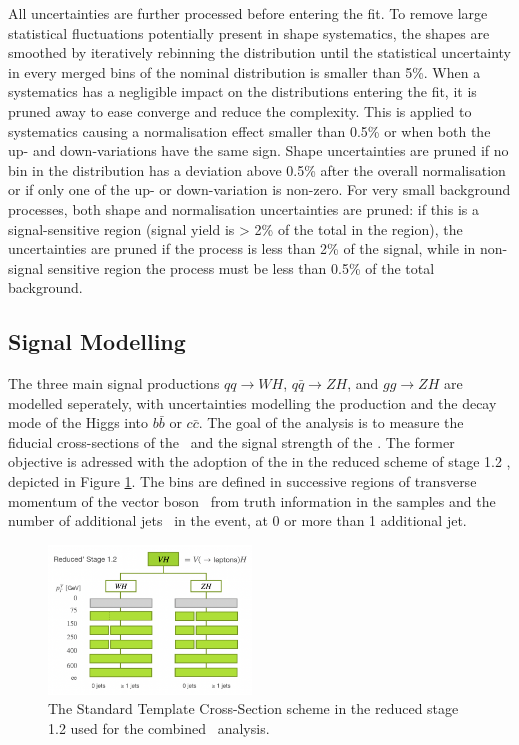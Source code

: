 All uncertainties are further processed before entering the fit. To remove large statistical fluctuations potentially present in shape systematics, the shapes are smoothed by iteratively rebinning the distribution until the statistical uncertainty in every merged bins of the nominal distribution is smaller than 5\%. When a systematics has a negligible impact on the distributions entering the fit, it is pruned away to ease converge and reduce the complexity. This is applied to systematics causing a normalisation effect smaller than 0.5\% or when both the up- and down-variations have the same sign. Shape uncertainties are pruned if no bin in the distribution has a deviation above 0.5\% after the overall normalisation or if only one of the up- or down-variation is non-zero. For very small background processes, both shape and normalisation uncertainties are pruned: if this is a signal-sensitive region (signal yield is > 2\% of the total in the region), the uncertainties are pruned if the process is less than 2\% of the signal, while in non-signal sensitive region the process must be less than 0.5\% of the total background.  

\subsection{Signal Modelling}\label{sec-modSignal}
The three main signal productions $qq \rightarrow WH$, $q\bar{q} \rightarrow ZH$, and $gg \rightarrow ZH$ are modelled seperately, with uncertainties modelling the production and the decay mode of the Higgs into $b\bar{b}$ or $c\bar{c}$. The goal of the analysis is to measure the fiducial cross-sections of the \vhb\ and the signal strength of the \vhc. The former objective is adressed with the adoption of the  in the reduced scheme of stage 1.2 \cite{badger2016les, berger2019simplified}, depicted in Figure \ref{fig:model-stxsscheme}. The bins are defined in successive regions of transverse momentum of the vector boson \ptv\ from truth information in the samples and the number of additional jets \nj\ in the event, at 0 or more than 1 additional jet.
  
  \begin{figure}[!htbp]
    \centering
    \includegraphics[width=0.48\textwidth]{Images/VH/Model/STXSsketch.png}
    \caption{The Standard Template Cross-Section scheme in the reduced stage 1.2 used for the combined \vhbc\ analysis.}
    \label{fig:model-stxsscheme}
  \end{figure}

